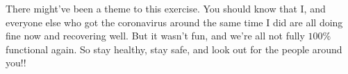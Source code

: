 \documentclass{article}
\begin{document}
	There might've been a theme to this exercise. You should know that I, and everyone else who got the coronavirus around the same time I did
		are all doing fine now and recovering well. But it wasn't fun, and we're all not fully $100\%$ functional again. So stay healthy,
		stay safe, and look out for the people around you!!
\end{document}
